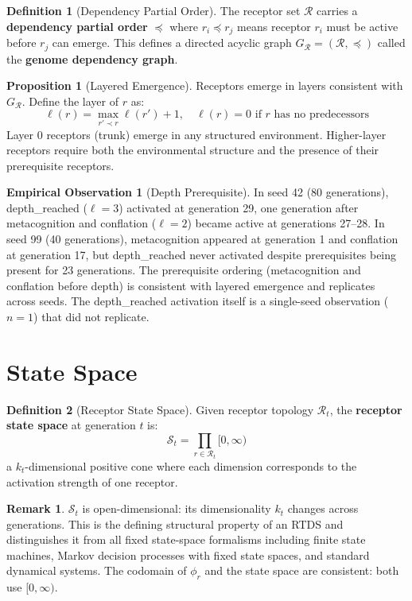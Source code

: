 \documentclass[12pt]{article}
\theoremstyle{definition}
\newtheorem{definition}{Definition}
\newtheorem{proposition}{Proposition}
\newtheorem{remark}{Remark}
\newtheorem{observation}{Empirical Observation}
\begin{document}
\begin{definition}[Dependency Partial Order]
The receptor set $\mathcal{R}$ carries a \textbf{dependency partial order} $\preceq$ where
$r_i \preceq r_j$ means receptor $r_i$ must be active before $r_j$ can emerge. This
defines a directed acyclic graph $G_\mathcal{R} = (\mathcal{R}, \preceq)$ called the
\textbf{genome dependency graph}.
\end{definition}

\begin{proposition}[Layered Emergence]
Receptors emerge in layers consistent with $G_\mathcal{R}$. Define the layer of $r$ as:
\[
\ell(r) = \max_{r' \prec r} \ell(r') + 1, \quad \ell(r) = 0 \text{ if } r \text{ has no predecessors}
\]
Layer 0 receptors (trunk) emerge in any structured environment. Higher-layer receptors
require both the environmental structure and the presence of their prerequisite receptors.
\end{proposition}

\begin{observation}[Depth Prerequisite]
In seed 42 (80 generations), depth\_reached ($\ell = 3$) activated at generation 29,
one generation after metacognition and conflation ($\ell = 2$) became active at
generations 27--28. In seed 99 (40 generations), metacognition appeared at generation 1
and conflation at generation 17, but depth\_reached never activated despite prerequisites
being present for 23 generations. The prerequisite ordering (metacognition and conflation
before depth) is consistent with layered emergence and replicates across seeds. The
depth\_reached activation itself is a single-seed observation ($n=1$) that did not
replicate.
\end{observation}

\section{State Space}

\begin{definition}[Receptor State Space]
Given receptor topology $\mathcal{R}_t$, the \textbf{receptor state space} at generation
$t$ is:
\[
\mathcal{S}_t = \prod_{r \in \mathcal{R}_t} [0, \infty)
\]
a $k_t$-dimensional positive cone where each dimension corresponds to the activation
strength of one receptor.
\end{definition}

\begin{remark}
$\mathcal{S}_t$ is open-dimensional: its dimensionality $k_t$ changes across generations.
This is the defining structural property of an RTDS and distinguishes it from all fixed
state-space formalisms including finite state machines, Markov decision processes with
fixed state spaces, and standard dynamical systems. The codomain of $\phi_r$ and the
state space are consistent: both use $[0, \infty)$.
\end{remark}
\end{document}
